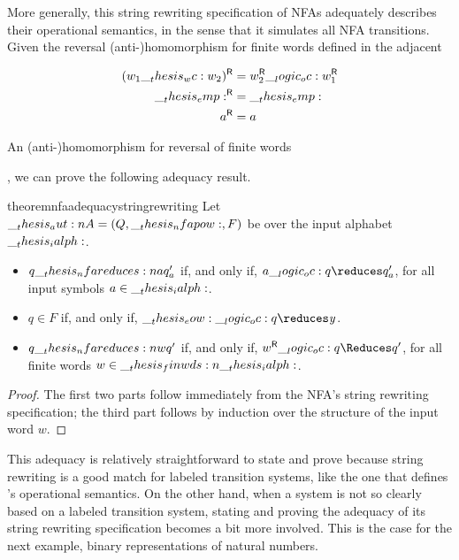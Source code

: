 More generally, this string rewriting specification of \acp{NFA} adequately describes their operational semantics, in the sense that it simulates all \ac{NFA} transitions.
Given the reversal (anti-)\-homo\-morph\-ism for finite words defined in the adjacent %
\begin{marginfigure}[-8\baselineskip]
  \begin{align*}
    \rev*{w_1 \wc w_2} &= \rev{w_2} \oc \rev{w_1} \\
    \rev{\emp} &= \emp \\
    \rev{a} &= a
  \end{align*}
  \caption{An (anti-)\-homo\-morph\-ism for reversal of finite words}\label{fig:string-rewriting:reversal}
\end{marginfigure}%
, we can prove the following adequacy result.
\begin{restatable}[
  name=Adequacy of \ac*{NFA} specification,
  label=thm:nfa-adequacy-string-rewriting
]{theorem}{nfaadequacystringrewriting}
  Let $\__thesis_aut:n {A} = (Q, \__thesis_nfapow:, F)$ be  over the input alphabet $\__thesis_ialph:$.
  \begin{itemize}[nosep]
  \item
    $q \nfareduces[a] q'_a$ if, and only if, $a \oc q \reduces q'_a$, for all input symbols $a \in \__thesis_ialph:$.
  \item
    $q \in F$ if, and only if, $\eow \oc q \reduces \symacc$.%
  \item
    $q \nfareduces[w] q'$ if, and only if, $\rev{w} \oc q \Reduces q'$, for all finite words $w \in \__thesis_finwds:n {\__thesis_ialph:}$.
  \end{itemize}  
\end{restatable}
\begin{proof}
  The first two parts follow immediately from the \ac{NFA}'s string rewriting specification; the third part follows by induction over the structure of the input word $w$.
\end{proof}

This adequacy  is relatively straightforward to state and prove because string rewriting is a good match for labeled transition systems, like the one that defines 's operational semantics.
On the other hand, when a system is not so clearly based on a labeled transition system, stating and proving the adequacy of its string rewriting specification becomes a bit more involved.
This is the case for the next example, binary representations of natural numbers.

